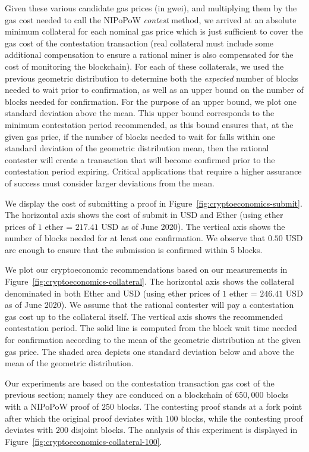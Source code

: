 Given these various candidate gas prices (in gwei), and multiplying them by the gas cost
needed to call the NIPoPoW \emph{contest} method, we arrived at an absolute minimum collateral
for each nominal gas price
which is just sufficient to cover the gas cost of the contestation transaction
(real collateral must include some additional compensation to ensure a rational miner
is also compensated for the cost of monitoring the blockchain). For each
of these collaterals, we used the previous geometric distribution to determine both the
\emph{expected} number of blocks needed to wait prior to confirmation, as well as an
upper bound on the number of blocks needed for confirmation. For the purpose of an upper bound, we
plot one standard deviation above the mean. This upper bound corresponds to the minimum
contestation period recommended, as this bound ensures that, at the given gas price,
if the number of blocks needed to wait for falls within one standard deviation of
the geometric distribution mean, then the rational contester will create a transaction that
will become confirmed prior to the contestation period expiring. Critical applications
that require a higher assurance of success must consider larger deviations from the
mean.

We display the cost of submitting a proof in
Figure~\ref{fig:cryptoeconomics-submit}. The horizontal axis shows the cost of
submit in USD and Ether (using ether prices of $1$ ether = $217.41$
USD as of June 2020). The vertical axis shows the number of blocks needed for
at least one confirmation. We observe that $0.50$ USD are
enough to ensure that the submission is confirmed within 5 blocks.

We plot our cryptoeconomic recommendations based on our measurements in
Figure~\ref{fig:cryptoeconomics-collateral}. The horizontal axis shows the collateral denominated in
both Ether and USD (using ether prices of $1$ ether = $246.41$ USD as of June 2020).
We assume that the rational contester will pay a contestation gas cost up to the
collateral itself. The vertical axis shows the recommended contestation period.
The solid line is computed from the block wait time needed for confirmation
according to the mean of the geometric distribution at the given gas price.
The shaded area depicts one standard deviation below and above the mean of
the geometric distribution.

Our experiments are based on the contestation transaction gas cost of the previous
section; namely they are conduced on a blockchain of $650{,}000$ blocks with a NIPoPoW
proof of $250$ blocks. The contesting proof stands at a fork point after which the
original proof deviates with $100$ blocks, while the contesting proof deviates with
$200$ disjoint blocks.
The analysis of this
experiment is displayed in Figure~\ref{fig:cryptoeconomics-collateral-100}.

